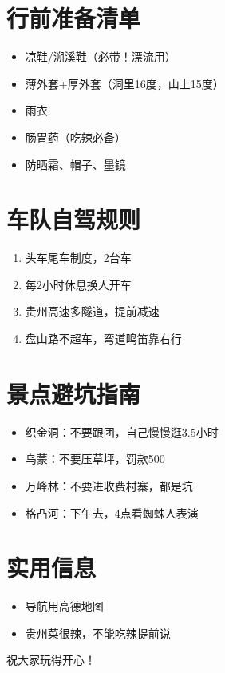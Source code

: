 \documentclass[12pt,a4paper,UTF8]{ctexart}
\begin{document}
\section{行前准备清单}
\begin{itemize}
\item 凉鞋/溯溪鞋（必带！漂流用）
\item 薄外套+厚外套（洞里16度，山上15度）
\item 雨衣
\item 肠胃药（吃辣必备）
\item 防晒霜、帽子、墨镜
\end{itemize}

\section{车队自驾规则}
\begin{enumerate}
\item 头车尾车制度，2台车
\item 每2小时休息换人开车
\item 贵州高速多隧道，提前减速
\item 盘山路不超车，弯道鸣笛靠右行
\end{enumerate}

\section{景点避坑指南}
\begin{itemize}
\item 织金洞：不要跟团，自己慢慢逛3.5小时
\item 乌蒙：不要压草坪，罚款500
\item 万峰林：不要进收费村寨，都是坑
\item 格凸河：下午去，4点看蜘蛛人表演
\end{itemize}

\section{实用信息}
\begin{itemize}
\item 导航用高德地图
\item 贵州菜很辣，不能吃辣提前说
\end{itemize}

\vspace{3cm}
\begin{center}
\Huge 祝大家玩得开心！
\end{center}
\end{document}
